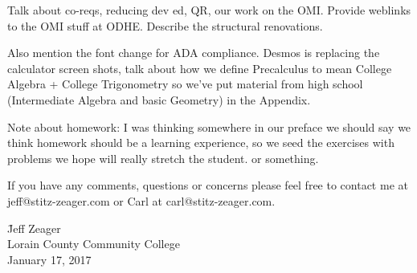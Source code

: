 \documentclass{ximera}
\begin{document}
\noindent 


Talk about co-reqs, reducing dev ed, QR, our work on the OMI.  Provide weblinks to the OMI stuff at ODHE.  Describe the structural renovations.  

Also mention the font change for ADA compliance.  Desmos is replacing the calculator screen shots,  talk about how we define Precalculus to mean College Algebra + College Trigonometry so we've put material from high school (Intermediate Algebra and basic Geometry) in the Appendix.

\noindent  Note about homework:  I was thinking somewhere in our preface we should say we think homework should be a learning experience, so we seed the exercises with problems we hope will really stretch the student. or something.

  If you have any comments, questions or concerns please feel free to contact me at jeff@stitz-zeager.com or Carl at carl@stitz-zeager.com.

\vspace{.5in}

\begin{tabbing}

\hspace{4in}   \= Jeff Zeager \\
               \> Lorain County Community College \\
               \> January 17, 2017
               
\end{tabbing}
\end{document}
